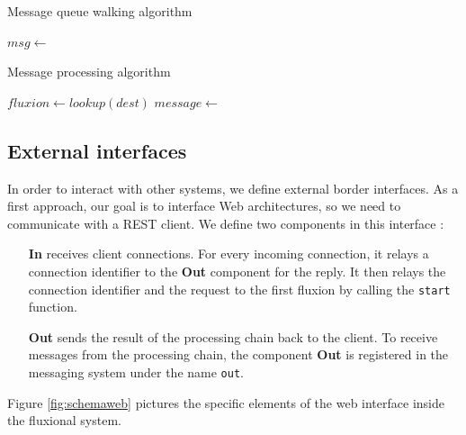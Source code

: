\begin{algorithm}
\caption{Message queue walking algorithm}
\label{alg:parcours}
\begin{algorithmic}
\State $msg \gets$  
\State {}
\EndWhile
\EndFunction
\end{algorithmic}
\end{algorithm}

\begin{algorithm}
\caption{Message processing algorithm}
\label{alg:traitement}
\begin{algorithmic}
\State $fluxion \gets lookup(dest)$
\State $message \gets$  
\State {} 
\EndFor
\EndFunction
\end{algorithmic}
\end{algorithm}

\subsection{External interfaces}

In order to interact with other systems, we define external border interfaces.
As a first approach, our goal is to interface Web architectures, so we need to communicate with a REST\cite{Fielding2002} client.
We define two components in this interface :

\begin{itemize}
	\item[\textbf{In}]
    receives client connections.
    For every incoming connection, it relays a connection identifier to the \textbf{Out} component for the reply.
    It then relays the connection identifier and the request to the first fluxion by calling the \texttt{start} function.
	\item[\textbf{Out}]
    sends the result of the processing chain back to the client.
    To receive messages from the processing chain, the component \textbf{Out} is registered in the messaging system under the name \texttt{out}.
\end{itemize}

Figure \ref{fig:schemaweb} pictures the specific elements of the web interface inside the fluxional system.

